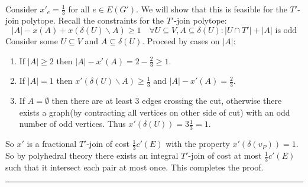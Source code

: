 \documentclass[letterpaper,12pt,oneside,onecolumn]{article}
\newenvironment{proof}{{\bf Proof:  }}{\hfill\rule{2mm}{2mm}}
\begin{document}
\begin{proof}
\paragraph{}
Consider $x'_e = \frac{1}{3}$ for all $e \in E(G')$. We will show that this is feasible for the $T'$-join polytope. Recall the constraints for the $T'$-join polytope:
$$|A| - x(A) + x(\delta(U)\backslash A) \geq 1 \quad \forall U \subseteq V, A \subseteq \delta(U): |U \cap T'| + |A|\text{ is odd}$$
Consider some $U\subseteq V$ and $A\subseteq \delta(U)$. Proceed by cases on $|A|$:
\begin{enumerate}
\item If $|A| \geq 2$ then $|A| - x'(A) = 2- \frac{2}{3} \geq 1$.
\item If $|A| = 1$ then $x'(\delta(U)\backslash A) \geq \frac{1}{3}$ and $|A|-x'(A) = \frac{2}{3}$.
\item If $A = \emptyset$ then there are at least $3$ edges crossing the cut, otherwise there exists a graph(by contracting all vertices on other side of cut) with an odd number of odd vertices. Thus $x'(\delta(U)) = 3\frac{1}{3} = 1$.
\end{enumerate}
So $x'$ is a fractional $T'$-join of cost $\frac{1}{3}c'(E)$ with the property $x'(\delta(v_P)) = 1$. So by polyhedral theory there exists an integral $T'$-join of cost at most $\frac{1}{3}c'(E)$ such that it intersect each pair at most once. This completes the proof.
\end{proof}
\end{document}

